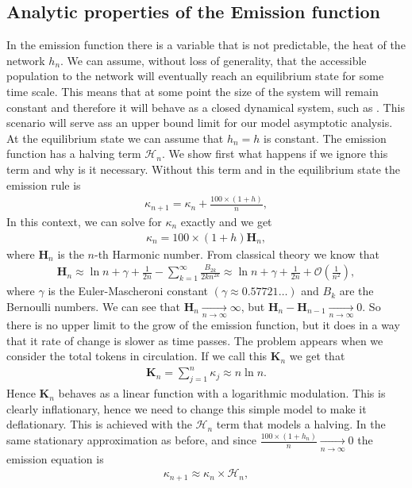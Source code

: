 \documentclass[11pt]{amsart}
\numberwithin{equation}{section}
\theoremstyle{definition}
\theoremstyle{remark}
\renewcommand{\_}[1]{_{\left( #1 \right)}}
\renewcommand{\^}[1]{^{\left( #1 \right)}}
\begin{document}
\subsection{Analytic properties of the Emission function}
In the emission function there is a variable that is not predictable, the heat of the network $h_n$. We can assume, without loss of generality, that the accessible population to the network will eventually reach an equilibrium state for some time scale. This means that at some point the size of the system will remain constant and therefore it will behave as a closed dynamical system, such as \cite{kermack,peruanisibona,verhulst}. This scenario will serve ass an upper bound limit for our model asymptotic analysis. At the equilibrium state we can assume that $h_n = h$ is constant.
The emission function has a halving term $\mathcal{H}_n$. We show first what happens if we ignore this term and why is it necessary. Without this term and in the equilibrium state the emission rule is
\begin{align*}
\kappa_{n+1} = \kappa_n  + \frac{100\times (1+ h)}{n},
\end{align*}
 In this context, we can solve for $\kappa_n$ exactly and we get
 \begin{align*}
 \kappa_n = 100\times (1+ h) \mathbf{H}_n, 
 \end{align*}
 where $\mathbf{H}_n$ is the $n$-th Harmonic number. From classical theory we know that
\begin{align*}
\mathbf{H}_n \approx \ln n + \gamma + \frac{1}{2n} - \sum_{k=1}^{\infty}\frac{B_{2k}}{2k n^{2k}} \approx \ln n + \gamma + \frac{1}{2n} + \mathcal{O}\left(\frac{1}{n^2}\right),
\end{align*}
where $\gamma$ is the Euler-Mascheroni constant $(\gamma \approx 0.57721\dots)$ and $B_k$ are the Bernoulli numbers. We can see that $\mathbf{H}_n \xrightarrow[n\rightarrow \infty]{} \infty$, but $\mathbf{H}_n - \mathbf{H}_{n-1} \xrightarrow[n\rightarrow \infty]{} 0$. So there is no upper limit to the grow of the emission function, but it does in a way that it rate of change is slower as time passes. The problem appears when we consider the total tokens in circulation. If we call this $\mathbf{K}_n$ we get that
\begin{align*}
\mathbf{K}_n = \sum_{j=1}^n \kappa_j \approx n \ln n.
\end{align*}  
Hence $\mathbf{K}_n$ behaves as a linear function with a logarithmic modulation. This is clearly inflationary, hence we need to change this simple model to make it deflationary. This is achieved with the $\mathcal{H}_n$ term that models a halving. In the same stationary approximation as before, and since $\frac{100\times (1+ h_n)}{n}  \xrightarrow[n\rightarrow \infty]{} 0$ the emission equation is
 \begin{align*}
 \kappa_{n+1} \approx \kappa_n \times \mathcal{H}_n,
 \end{align*}
 
\end{document}
